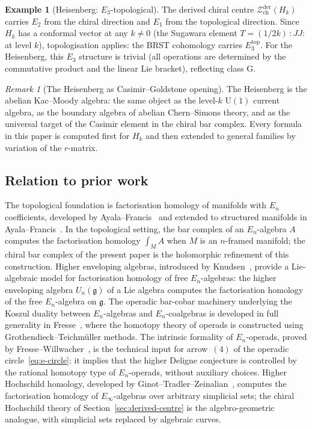 \documentclass[11pt,reqno]{amsart}
\theoremstyle{definition}
\newtheorem{example}[theorem]{Example}
\theoremstyle{remark}
\newtheorem{remark}[theorem]{Remark}
\providecommand{\cZ}{\mathcal{Z}}
\providecommand{\fg}{\mathfrak{g}}
\providecommand{\Eone}{E_1}
\providecommand{\Etwo}{E_2}
\providecommand{\Ethree}{E_3}
\providecommand{\En}{E_n}
\providecommand{\Einf}{E_\infty}
\begin{document}
\begin{example}[Heisenberg: $\Ethree$-topological]
\label{ex:e-heis-e3}
The derived chiral centre
$\cZ^{\mathrm{der}}_{\mathrm{ch}}(H_k)$ carries
$\Etwo$ from the chiral direction and $\Eone$ from the
topological direction. Since $H_k$ has a conformal vector
at any $k \neq 0$ (the Sugawara element
$T = (1/2k)\,{:}JJ{:}$ at level $k$), topologisation applies:
the BRST cohomology carries $\Ethree^{\mathrm{top}}$.
For the Heisenberg, this $\Ethree$ structure is trivial
(all operations are determined by the commutative product
and the linear Lie bracket), reflecting class G.
\end{example}

\begin{remark}[The Heisenberg as Casimir--Goldstone opening]
\label{rem:e-heis-cg}
The Heisenberg is the abelian Kac--Moody algebra:
the same object as the level-$k$ $\mathrm{U}(1)$ current
algebra, as the boundary algebra of abelian Chern--Simons
theory, and as the universal target of the Casimir element
in the chiral bar complex. Every formula in this paper is
computed first for $H_k$ and then extended to general
families by variation of the $r$-matrix.
\end{remark}

\subsection{Relation to prior work}

The topological foundation is factorisation homology of manifolds
with $\En$ coefficients, developed by Ayala--Francis~\cite{AF15}
and extended to structured manifolds in
Ayala--Francis~\cite{AF19}.  In the topological setting, the
bar complex of an $\En$-algebra $A$ computes the
factorisation homology $\int_M A$ when $M$ is an
$n$-framed manifold; the chiral bar complex of the present
paper is the holomorphic refinement of this construction.
Higher enveloping algebras, introduced by
Knudsen~\cite{Knudsen18}, provide a Lie-algebraic model for
factorisation homology of free $\En$-algebras: the higher
enveloping algebra $U_n(\fg)$ of a Lie algebra computes the
factorisation homology of the free $\En$-algebra on $\fg$.
The operadic bar-cobar machinery underlying the Koszul duality
between $\En$-algebras and $\En$-coalgebras is developed in
full generality in Fresse~\cite{Fresse17}, where the homotopy
theory of operads is constructed using Grothendieck--Teichm\"uller
methods.  The intrinsic formality of $\En$-operads, proved by
Fresse--Willwacher~\cite{FresseWillwacher20}, is the technical
input for arrow~$(4)$ of the operadic
circle~\eqref{eq:e-circle}: it implies that the higher Deligne
conjecture is controlled by the rational homotopy type of
$\En$-operads, without auxiliary choices.  Higher Hochschild
homology, developed by Ginot--Tradler--Zeinalian~\cite{GTZ14},
computes the factorisation homology of $\Einf$-algebras over
arbitrary simplicial sets; the chiral Hochschild theory of
Section~\ref{sec:derived-centre} is the algebro-geometric
analogue, with simplicial sets replaced by algebraic curves.
\end{document}
